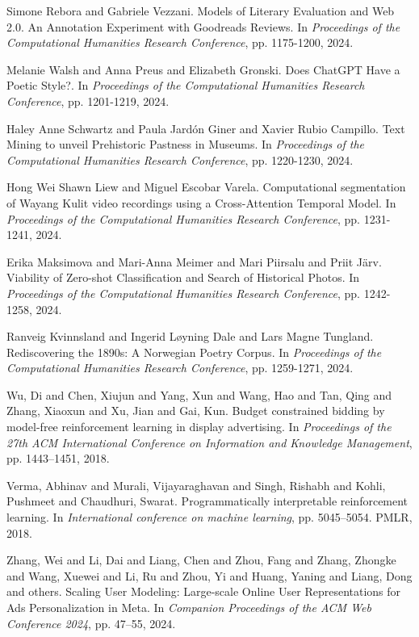 \begin{thebibliography}{99}
 Simone Rebora and Gabriele Vezzani. {M}odels of {L}iterary {E}valuation and {W}eb 2.0. {A}n {A}nnotation {E}xperiment with {G}oodreads {R}eviews. In \textit{Proceedings of the Computational Humanities Research Conference}, pp. 1175-1200, 2024.

 Melanie Walsh and Anna Preus and Elizabeth Gronski. {D}oes {C}hat{G}PT {H}ave a {P}oetic {S}tyle?. In \textit{Proceedings of the Computational Humanities Research Conference}, pp. 1201-1219, 2024.

 Haley Anne Schwartz and Paula Jard{\'o}n Giner and Xavier Rubio Campillo. {T}ext {M}ining to unveil {P}rehistoric {P}astness in {M}useums. In \textit{Proceedings of the Computational Humanities Research Conference}, pp. 1220-1230, 2024.

 Hong Wei Shawn Liew and Miguel Escobar Varela. {C}omputational segmentation of {W}ayang {K}ulit video recordings using a {C}ross-{A}ttention {T}emporal {M}odel. In \textit{Proceedings of the Computational Humanities Research Conference}, pp. 1231-1241, 2024.

 Erika Maksimova and Mari-Anna Meimer and Mari Piirsalu and Priit J{\"a}rv. {V}iability of {Z}ero-shot {C}lassification and {S}earch of {H}istorical {P}hotos. In \textit{Proceedings of the Computational Humanities Research Conference}, pp. 1242-1258, 2024.

 Ranveig Kvinnsland and Ingerid L{\o}yning Dale and Lars Magne Tungland. {R}ediscovering the 1890s: {A} Norwegian {P}oetry {C}orpus. In \textit{Proceedings of the Computational Humanities Research Conference}, pp. 1259-1271, 2024.

 Wu, Di and Chen, Xiujun and Yang, Xun and Wang, Hao and Tan, Qing and Zhang, Xiaoxun and Xu, Jian and Gai, Kun. {B}udget constrained bidding by model-free reinforcement learning in display advertising. In \textit{Proceedings of the 27th ACM International Conference on Information and Knowledge Management}, pp. 1443--1451, 2018.

 Verma, Abhinav and Murali, Vijayaraghavan and Singh, Rishabh and Kohli, Pushmeet and Chaudhuri, Swarat. {P}rogrammatically interpretable reinforcement learning. In \textit{International conference on machine learning}, pp. 5045--5054. PMLR, 2018.

 Zhang, Wei and Li, Dai and Liang, Chen and Zhou, Fang and Zhang, Zhongke and Wang, Xuewei and Li, Ru and Zhou, Yi and Huang, Yaning and Liang, Dong and others. {S}caling {U}ser {M}odeling: {L}arge-scale {O}nline {U}ser {R}epresentations for {A}ds {P}ersonalization in {M}eta. In \textit{Companion Proceedings of the ACM Web Conference 2024}, pp. 47--55, 2024.


\end{thebibliography}

